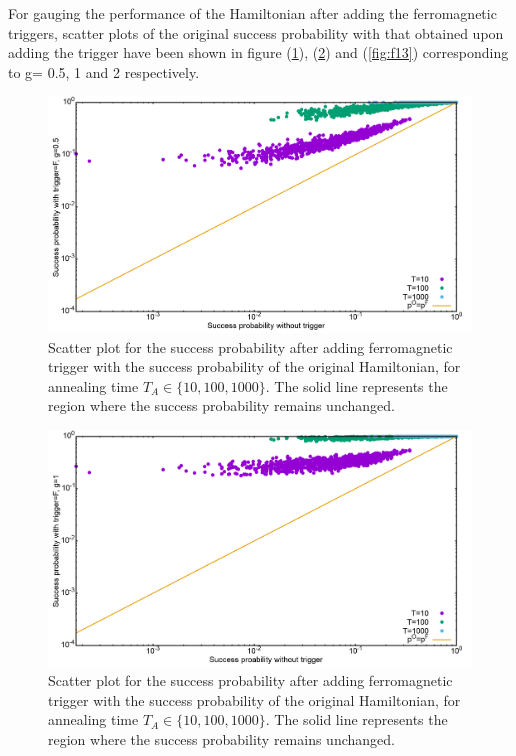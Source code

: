 \documentclass[12]{article}
\begin{document}
For gauging the performance of the Hamiltonian after adding the ferromagnetic triggers, scatter plots of the original success probability with that obtained upon adding the trigger have been shown in figure (\ref{fig:f11}), (\ref{fig:f12}) and (\ref{fig:f13}) corresponding to g= 0.5, 1 and 2 respectively.
\begin{figure}[H]
\centering 
\includegraphics[scale=0.3]{Scatt_s12_F_g0.png}
\caption{Scatter plot for the success probability after adding ferromagnetic trigger with the success probability of the original Hamiltonian, for annealing time $T_A \in \{10,100,1000\}$. The solid line represents the region where the success probability remains unchanged.}
\label{fig:f11}
\end{figure}
\begin{figure}[H]
\centering
\includegraphics[scale=0.3]{Scatt_s12_F_g1.png}
\caption{Scatter plot for the success probability after adding ferromagnetic trigger with the success probability of the original Hamiltonian, for annealing time $T_A \in \{10,100,1000\}$. The solid line represents the region where the success probability remains unchanged.}
\label{fig:f12}
\end{figure}
\end{document}
